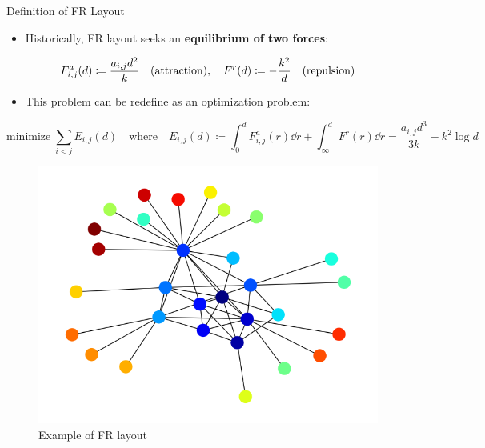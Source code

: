 \documentclass[13pt,aspectratio=169,table,dvipdfmx]{beamer}
\newcommand{\defeq}{\coloneqq}
\newif\ifShowHidden
\begin{document}
\ifShowHidden
    \begin{frame}{Definition of FR Layout}
        \begin{itemize}
            \item Historically, FR layout seeks an \textbf{equilibrium of two forces}:
        \end{itemize}
        \begin{equation*}
            F_{i,j}^a(d) \defeq \frac{a_{i,j} d^2}{k} \text{\quad (attraction)}, \quad F^r(d) \defeq -\frac{k^2}{d} \text{\quad (repulsion)}
        \end{equation*}
        \begin{itemize}
            \item This problem can be redefine as an optimization problem:
        \end{itemize}
        \begin{equation*}
            \mathrm{minimize} \; \sum_{i<j} E_{i,j}(d)
            \quad \mathrm{where} \quad
            E_{i,j}(d) \defeq \int_{0}^{d} F_{i,j}^a(r) \dd{r} + \int_{\infty}^{d} F^r(r) \dd{r} = \frac{a_{i,j} d^3}{3k} - k^2\log{d}
        \end{equation*}
        \begin{figure}[htbp]
            \begin{minipage}{0.49\hsize}
                \centering
                \includegraphics[width=0.6\columnwidth]{imgs/example_fr.png}
                \caption{
                    Example of FR layout
                }
            \end{minipage}
            \begin{minipage}{0.49\hsize}
                \centering
\end{minipage}
\end{figure}
\end{frame}
\end{document}
